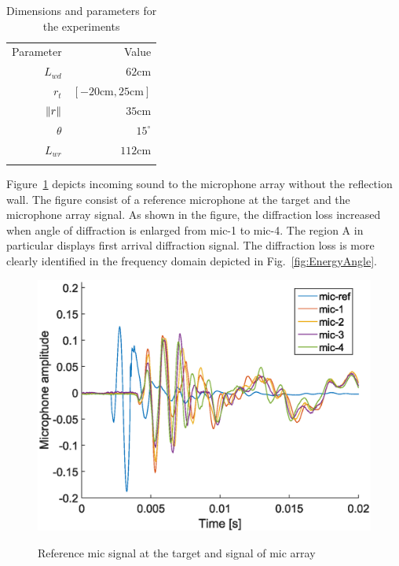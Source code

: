 \documentclass[letterpaper, 10 pt, conference]{ieeeconf}  %
\begin{document}
\begin{table}[h]
    \centering \caption{Dimensions and parameters for the experiments}
    \label{tab:experimental_param}
    \begin{tabular}{r|r}
        \hline\noalign{\smallskip}
        Parameter & Value \\
         \noalign{\smallskip}\hline\noalign{\smallskip}
         $L_{wd}$ & $62\text{cm}$ \\
         $r_t$ & $[-20\text{cm}, 25\text{cm}]$ \\
         $\lVert{r}\rVert$ & $35 \text{cm}$\\
         $\theta$ & $15^\circ$\\
         $L_{wr}$ & $112\text{cm}$\\
        \noalign{\smallskip}\hline\noalign{\smallskip}
     \end{tabular}
\end{table}

Figure~\ref{fig:signal} depicts incoming sound to the microphone array without the reflection wall. The figure consist of a reference microphone at the target and the microphone array signal. As shown in the figure, the diffraction loss increased when angle of diffraction is enlarged from mic-1 to mic-4. The region A in particular displays first arrival diffraction signal. The diffraction loss is more clearly identified in the frequency domain depicted in Fig.~\ref{fig:EnergyAngle}. 

\begin{figure}[thpb]
    {\centering
    \includegraphics[width=0.8\columnwidth]{Figures/diffraction_signal.eps}
	}
    \caption{Reference mic signal at the target and signal of mic array}\label{fig:signal}
\end{figure}
\end{document}
